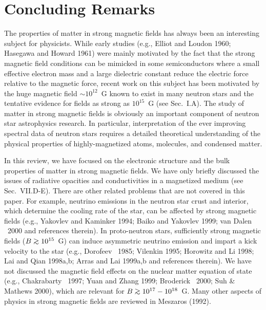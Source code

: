 \section{Concluding Remarks}

The properties of matter in strong magnetic fields has always been 
an interesting subject for physicists. While early studies
(e.g., Elliot and Loudon 1960; Hasegawa and Howard 1961)
were mainly motivated by the fact that the strong magnetic field
conditions can be mimicked in some semiconductors where a small
effective electron mass and a large dielectric constant reduce the electric
force relative to the magnetic force, recent work on this
subject has been motivated by the huge magnetic field $\sim 10^{12}$~G
known to exist in many neutron stars and the tentative evidence
for fields as strong as $10^{15}$~G (see Sec.~I.A).
The study of matter in strong magnetic fields 
is obviously an important component of neutron star astrophysics research.
In particular, interpretation of the ever improving spectral 
data of neutron stars requires a detailed theoretical understanding 
of the physical properties of highly-magnetized atoms, molecules, and
condensed matter.

In this review, we have focused on the electronic structure and 
the bulk properties of matter in strong magnetic fields. We have only 
briefly discussed the issues of radiative opacities and conductivities
in a magnetized medium (see Sec.~VII.D-E). There are other related 
problems that are not covered in this paper. For example, 
neutrino emissions in the neutron star crust and interior, 
which determine the cooling rate of the star, can be affected by strong
magnetic fields (e.g., Yakovlev and Kaminker 1994; Baiko and Yakovlev 1999;
van Dalen \etal~2000 and references therein). In proto-neutron stars,
sufficiently strong magnetic fields ($B\go 10^{15}$~G) can induce asymmetric
neutrino emission and impart a kick velocity to the star (e.g.,
Dorofeev \etal~1985; Vilenkin 1995; Horowitz and Li 1998; 
Lai and Qian 1998a,b; Arras and Lai 1999a,b and references therein). 
We have not discussed the magnetic field effects on the 
nuclear matter equation of
state (e.g., Chakrabarty \etal~1997; Yuan and Zhang 1999; 
Broderick \etal~2000; Suh \& Mathews 2000), 
which are relevant for $B\go 10^{17}-10^{18}$~G. Many other
aspects of physics in strong magnetic fields are reviewed in Meszaros (1992).

